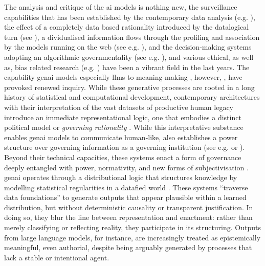 The analysis and critique of the \gls{ai} models is nothing new, the
surveillance capabilities that has been established by the contemporary data
analysis (e.g. \cite{Krasmann2017}), the effect of a completely data based
rationality introduced by the datalogical turn (see \cite{Clough2015}), a
dividualised information flows through the profiling and association by the
models running on the web (see e.g. \cite{Cheney2011}), and the decision-making
systems adopting an algorithmic
governmentality (see e.g.
\cite{rouvroy2007}), and various ethical, as well as, bias related research
(e.g. \cite{kordzadeh2022}) have been a vibrant field in the last years. The
capability \gls{genai} models especially \glspl{llm} to meaning-making
\parencite[]{gretzky2024, mishra2024, dishon2024}, however, , have provoked
renewed inquiry. While these generative processes are rooted in a long history
of statistical and computational development, contemporary architectures with
their interpretation of the vast datasets of productive human legacy introduce
an immediate representational logic, one that embodies a distinct political
model or \emph{governing rationality} \parencite[2]{amoore2024}. While this
interpretative substance
enables \gls{genai} models to communicate human-like, also establishes a power
structure over governing information as a governing institution (see e.g.
\cite{mackenzie2021} or \cite{dishon2024}). Beyond their technical capacities, these systems enact a form of governance deeply entangled with power, normativity, and new forms of subjectivisation \parencite{eloff2021}. \Gls{genai} operates through a distributional logic that structures knowledge by modelling statistical regularities in a datafied world \parencite{amoore2023}. These systems “traverse data foundations” to generate outputs that appear plausible within a learned distribution, but without deterministic causality or transparent justification. In doing so, they blur the line between representation and enactment: rather than merely classifying or reflecting reality, they participate in its structuring. Outputs from large language models, for instance, are increasingly treated as epistemically meaningful, even authorial, despite being arguably generated by processes that lack a stable or intentional agent.


